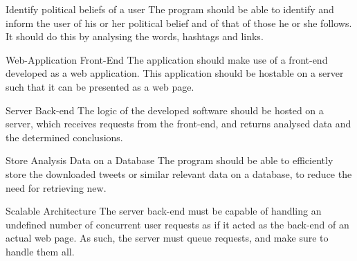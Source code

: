 \begin{requirement}{Identify political beliefs of a user}
The program should be able to identify and inform the user of his or her
political belief and of that of those he or she follows. It should do this by
analysing the words, hashtags and links.

\end{requirement}

\begin{requirement}{Web-Application Front-End}
The application should make use of a front-end developed as a web application.
This application should be hostable on a server such that it can be presented as
a web page.
\end{requirement}

\begin{requirement}{Server Back-end}
The logic of the developed software should be hosted on a server, which receives
requests from the front-end, and returns analysed data and the determined
conclusions.
\end{requirement}

\begin{requirement}{Store Analysis Data on a Database}
The program should be able to efficiently store the downloaded tweets or similar
relevant data on a database, to reduce the need for retrieving new.
\end{requirement}

\begin{requirement}{Scalable Architecture}
The server back-end must be capable of handling an undefined number of
concurrent user requests as if it acted as the back-end of an actual web page.
As such, the server must queue requests, and make sure to handle them all.
\end{requirement}

